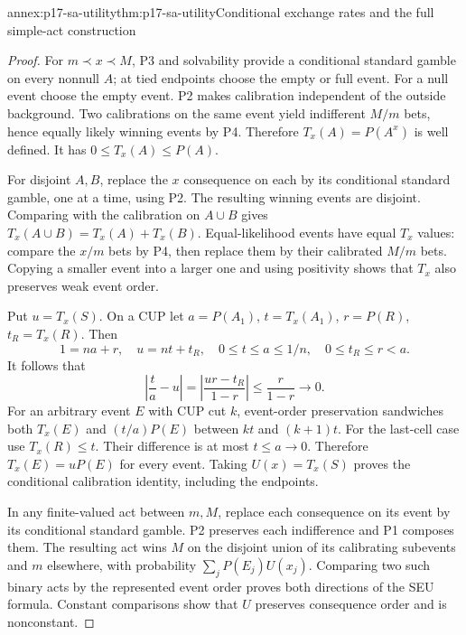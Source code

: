 \begin{annexitem}{annex:p17-sa-utility}{thm:p17-sa-utility}{Conditional exchange rates and the full simple-act construction}
\begin{proof}
For \(m\prec x\prec M\), P3 and solvability provide a
conditional standard gamble on every nonnull \(A\);
at tied endpoints choose the empty or full event.
For a null event choose the empty event.
P2 makes calibration independent of the outside background.
Two calibrations on the same event yield indifferent
\(M/m\) bets, hence equally likely winning events by P4.
Therefore \(T_x(A)=P(A^x)\) is well defined.
It has \(0\leq T_x(A)\leq P(A)\).

For disjoint \(A,B\), replace the \(x\) consequence on
each by its conditional standard gamble, one at a time,
using P2. The resulting winning events are disjoint.
Comparing with the calibration on \(A\cup B\) gives
\(T_x(A\cup B)=T_x(A)+T_x(B)\).
Equal-likelihood events have equal \(T_x\) values: compare
the \(x/m\) bets by P4, then replace them by their
calibrated \(M/m\) bets. Copying a smaller event into a
larger one and using positivity shows that \(T_x\) also
preserves weak event order.

Put \(u=T_x(S)\). On a CUP let
\(a=P(A_1)\), \(t=T_x(A_1)\), \(r=P(R)\),
\(t_R=T_x(R)\). Then
\[
 1=na+r,\quad u=nt+t_R,\quad
 0\leq t\leq a\leq1/n,\quad 0\leq t_R\leq r<a.
\]
It follows that
\[
 \left|\frac ta-u\right|
 =\left|\frac{ur-t_R}{1-r}\right|
 \leq\frac r{1-r}\longrightarrow0.
\]
For an arbitrary event \(E\) with CUP cut \(k\),
event-order preservation sandwiches both \(T_x(E)\) and
\((t/a)P(E)\) between \(kt\) and \((k+1)t\).
For the last-cell case use \(T_x(R)\leq t\).
Their difference is at most \(t\leq a\to0\).
Therefore \(T_x(E)=uP(E)\) for every event.
Taking \(U(x)=T_x(S)\) proves the conditional calibration
identity, including the endpoints.

In any finite-valued act between \(m,M\), replace each
consequence on its event by its conditional standard gamble.
P2 preserves each indifference and P1 composes them.
The resulting act wins \(M\) on the disjoint union of its
calibrating subevents and \(m\) elsewhere, with probability
\(\sum_jP(E_j)U(x_j)\).
Comparing two such binary acts by the represented event
order proves both directions of the SEU formula.
Constant comparisons show that \(U\) preserves consequence
order and is nonconstant.


\end{proof}
\end{annexitem}
